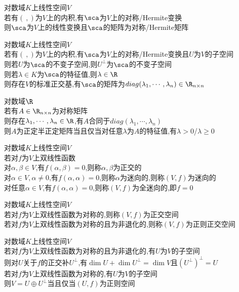 \begin{dingli}
对数域$K$上线性空间$V$\\
若有$(\ ,)$为$V$上的内积,有$\sca$为$V$上的对称/Hermite变换\\
则$\sca$为$V$上的线性变换且$\sca$的矩阵为对称/Hermite矩阵
\end{dingli}

\begin{dingli}
对数域$K$上线性空间$V$\\
若有$(\ ,)$为$V$上的内积,有$\sca$为$V$上的对称/Hermite变换且$U$为$V$的子空间\\
则若$U$为$\sca$的不变子空间,则$U^{\perp}$为$\sca$的不变子空间\\
则若$\lambda\in K$为$\sca$的特征值,则$\lambda\in \R$\\
则存在$V$的标准正交基,有$\sca$的矩阵为$diag(\lambda_1,\cdots,\lambda_n)\in \R_{n\times n}$
\end{dingli}

\begin{dingli}
对数域$\R$\\
若有$A\in \R_{n\times n}$为对称矩阵\\
则存在$\lambda_1,\cdots,\lambda_n\in \R$,有$A$合同于$diag(\lambda_1,\cdots,\lambda_n)$\\
则$A$为正定半正定矩阵当且仅当对任意$\lambda$为$A$的特征值,有$\lambda>0$/$\lambda\geq0$
\end{dingli}

\begin{dingyi}
对数域$K$上线性空间$V$\\
若对$f$为$V$上双线性函数\\
对$\alpha,\beta\in V$,有$f(\alpha,\beta)=0$,则称$\alpha,\beta$为正交的\\
对$\alpha\in V,\alpha\neq 0$,有$f(\alpha,\alpha)=0$,则称$\alpha$为迷向的,则称$(V,f)$为迷向的\\
对任意$\alpha\in V$,有$f(\alpha,\alpha)=0$,则称$(V,f)$为全迷向的,即$f=0$
\end{dingyi}

\begin{dingyi}
对数域$K$上线性空间$V$\\
若对$f$为$V$上双线性函数为对称的,则称$(V,f)$为正交空间\\
若对$f$为$V$上双线性函数为对称的且为非退化的,则称$(V,f)$为正则正交空间
\end{dingyi}

\begin{dingli}
对数域$K$上线性空间$V$\\
若对$f$为$V$上双线性函数为对称的且为非退化的,有$U$为$V$的子空间\\
则对$U$关于$f$的正交补$U^{\perp}$,有$\dim U+\dim U^{\perp}=\dim V$且$(U^{\perp})^{\perp}=U$\\
若对$f$为$V$上双线性函数为对称的,有$U$为$V$的子空间\\
则$V=U\oplus U^{\perp}$当且仅当$(U,f)$为正则空间
\end{dingli}

